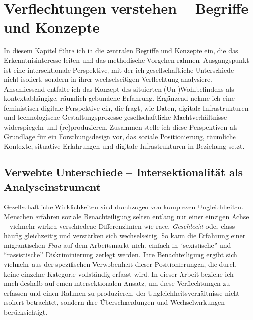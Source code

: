 
\chapter{Verflechtungen verstehen -- Begriffe und Konzepte} \label{sec:theoretischer_rahmen}

In diesem Kapitel führe ich in die zentralen Begriffe und Konzepte ein, die das Erkenntnisinteresse leiten und das methodische Vorgehen rahmen. Ausgangspunkt ist eine intersektionale Perspektive, mit der ich gesellschaftliche Unterschiede nicht isoliert, sondern in ihrer wechselseitigen Verflechtung analysiere. Anschliessend entfalte ich das Konzept des situierten (Un\nobreakdash-)Wohl\-be\-find\-ens als kontextabhängige, räumlich gebundene Erfahrung. Ergänzend nehme ich eine feministisch-digitale Perspektive ein, die fragt, wie Daten, digitale Infrastrukturen und technologische Gestaltungsprozesse gesellschaftliche Machtverhältnisse widerspiegeln und (re)produzieren. Zusammen stelle ich diese Perspektiven als Grundlage für ein Forschungsdesign vor, das soziale Positionierung, räumliche Kontexte, situative Erfahrungen und digitale Infrastrukturen in Beziehung setzt.

\section{Verwebte Unterschiede -- Intersektionalität als Analyseinstrument}

Gesellschaftliche Wirklichkeiten sind durchzogen von komplexen Ungleichheiten. Menschen erfahren soziale Benachteiligung selten entlang nur einer einzigen Achse -- vielmehr wirken verschiedene Differenzlinien wie \gls{race}, \emph{Geschlecht} oder \gls{class} häufig gleichzeitig und verstärken sich wechselseitig. So kann die Erfahrung einer migrantischen \emph{Frau} auf dem Arbeitsmarkt nicht einfach in \enquote{sexistische} und \enquote{rassistische} Diskriminierung zerlegt werden. Ihre Benachteiligung ergibt sich vielmehr aus der spezifischen Verwobenheit dieser Positionierungen, die durch keine einzelne Kategorie vollständig erfasst wird. In dieser Arbeit beziehe ich mich deshalb auf einen intersektionalen Ansatz, um diese Verflechtungen zu erfassen und einen Rahmen zu produzieren, der Ungleichheitsverhältnisse nicht isoliert betrachtet, sondern ihre Überschneidungen und Wechselwirkungen berücksichtigt.


